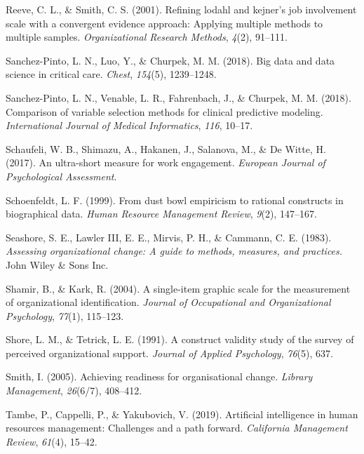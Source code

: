 \documentclass[
  man]{apa7}
\newlength{\cslhangindent}
\newlength{\cslentryspacingunit} %
\newenvironment{CSLReferences}[2] %
 {%
  \setlength{\parindent}{0pt}
  \ifodd #1
  \let\oldpar\par
  \def\par{\hangindent=\cslhangindent\oldpar}
  \fi
  \setlength{\parskip}{#2\cslentryspacingunit}
 }%
 {}
\begin{document}
\begin{CSLReferences}{1}{0}
\leavevmode{}%
Reeve, C. L., \& Smith, C. S. (2001). Refining lodahl and kejner's job involvement scale with a convergent evidence approach: Applying multiple methods to multiple samples. \emph{Organizational Research Methods}, \emph{4}(2), 91--111.

\leavevmode{}%
Sanchez-Pinto, L. N., Luo, Y., \& Churpek, M. M. (2018). Big data and data science in critical care. \emph{Chest}, \emph{154}(5), 1239--1248.

\leavevmode{}%
Sanchez-Pinto, L. N., Venable, L. R., Fahrenbach, J., \& Churpek, M. M. (2018). Comparison of variable selection methods for clinical predictive modeling. \emph{International Journal of Medical Informatics}, \emph{116}, 10--17.

\leavevmode{}%
Schaufeli, W. B., Shimazu, A., Hakanen, J., Salanova, M., \& De Witte, H. (2017). An ultra-short measure for work engagement. \emph{European Journal of Psychological Assessment}.

\leavevmode{}%
Schoenfeldt, L. F. (1999). From dust bowl empiricism to rational constructs in biographical data. \emph{Human Resource Management Review}, \emph{9}(2), 147--167.

\leavevmode{}%
Seashore, S. E., Lawler III, E. E., Mirvis, P. H., \& Cammann, C. E. (1983). \emph{Assessing organizational change: A guide to methods, measures, and practices.} John Wiley \& Sons Inc.

\leavevmode{}%
Shamir, B., \& Kark, R. (2004). A single-item graphic scale for the measurement of organizational identification. \emph{Journal of Occupational and Organizational Psychology}, \emph{77}(1), 115--123.

\leavevmode{}%
Shore, L. M., \& Tetrick, L. E. (1991). A construct validity study of the survey of perceived organizational support. \emph{Journal of Applied Psychology}, \emph{76}(5), 637.

\leavevmode{}%
Smith, I. (2005). Achieving readiness for organisational change. \emph{Library Management}, \emph{26}(6/7), 408--412.

\leavevmode{}%
Tambe, P., Cappelli, P., \& Yakubovich, V. (2019). Artificial intelligence in human resources management: Challenges and a path forward. \emph{California Management Review}, \emph{61}(4), 15--42.


\end{CSLReferences}
\end{document}
